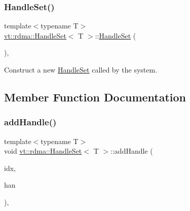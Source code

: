 \subsubsection{\texorpdfstring{Handle\+Set()}{HandleSet()}\hspace{0.1cm}{\footnotesize\ttfamily [4/4]}}
{\footnotesize\ttfamily template$<$typename T$>$ \\
\hyperlink{structvt_1_1rdma_1_1_handle_set}{vt\+::rdma\+::\+Handle\+Set}$<$ T $>$\+::\hyperlink{structvt_1_1rdma_1_1_handle_set}{Handle\+Set} (\begin{DoxyParamCaption}\item[{\hyperlink{structvt_1_1rdma_1_1_handle_set_1_1_build_set_tag_type}{Build\+Set\+Tag\+Type}}]{ }\end{DoxyParamCaption})\hspace{0.3cm}{\ttfamily [inline]}, {\ttfamily [private]}}



Construct a new {\ttfamily \hyperlink{structvt_1_1rdma_1_1_handle_set}{Handle\+Set}} called by the system. 



\subsection{Member Function Documentation}
\mbox{\label{structvt_1_1rdma_1_1_handle_set_a870d2596189da0477b434b268e1c2137}} 
\subsubsection{\texorpdfstring{add\+Handle()}{addHandle()}}
{\footnotesize\ttfamily template$<$typename T$>$ \\
void \hyperlink{structvt_1_1rdma_1_1_handle_set}{vt\+::rdma\+::\+Handle\+Set}$<$ T $>$\+::add\+Handle (\begin{DoxyParamCaption}\item[{\hyperlink{structvt_1_1rdma_1_1_handle_set_aa0dbb6a47c459fb4290f0ca96e573097}{Index\+Type} const \&}]{idx,  }\item[{\hyperlink{structvt_1_1rdma_1_1_handle_set_ab3a698ee86bae503dfa84617205b2dd9}{Handle\+Type}}]{han }\end{DoxyParamCaption})\hspace{0.3cm}{\ttfamily [inline]}, {\ttfamily [private]}}



